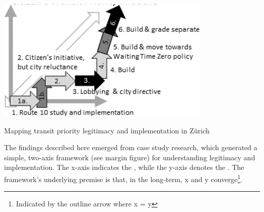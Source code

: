\documentclass{tufte-handout}
\begin{document}
\begin{marginfigure}%
  \includegraphics[width=\linewidth]{Zurich}
  \caption{Mapping transit priority legitimacy and implementation in Zürich}
  \label{fig:Zurich}
\end{marginfigure}


The findings described here emerged from case study research, which generated a simple, two-axis framework (see margin figure) for understanding legitimacy and implementation. The x-axis indicates the , while the y-axis denotes the .  The framework's underlying premise is that, in the long-term,  x and y converge\footnote{Indicated by the outline arrow where x = y}. 
\end{document}

